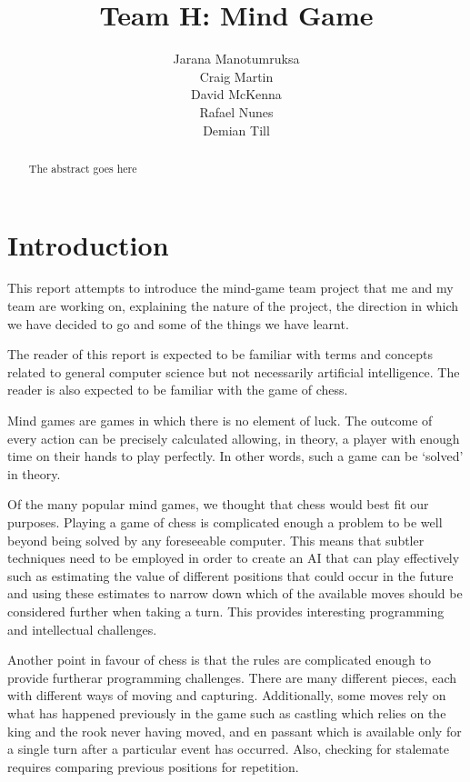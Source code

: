 \documentclass{l3proj}
\begin{document}
\title{Team H: Mind Game}
\author{Jarana Manotumruksa\\
	Craig Martin \\
	David McKenna \\
	Rafael Nunes \\
	Demian Till \\
	}
\maketitle
\begin{abstract}

The abstract goes here

\end{abstract}
\educationalconsent
\tableofcontents
\chapter{Introduction}
\label{intro}

This report attempts to introduce the mind-game team project that me and my team are
working on, explaining the nature of the project, the direction in which we have decided to
go and some of the things we have learnt.

The reader of this report is expected to be familiar with terms and concepts related to
general computer science but not necessarily artificial intelligence. The reader is also
expected to be familiar with the game of chess.

Mind games are games in which there is no element of luck. The outcome of every action
can be precisely calculated allowing, in theory, a player with enough time on their hands to
play perfectly. In other words, such a game can be ‘solved’ in theory.

Of the many popular mind games, we thought that chess would best fit our purposes.
Playing a game of chess is complicated enough a problem to be well beyond being solved
by any foreseeable computer. This means that subtler techniques need to be employed in
order to create an AI that can play effectively such as estimating the value of different
positions that could occur in the future and using these estimates to narrow down which of
the available moves should be considered further when taking a turn. This provides
interesting programming and intellectual challenges.

Another point in favour of chess is that the rules are complicated enough to provide furtherar
programming challenges. There are many different pieces, each with different ways of
moving and capturing. Additionally, some moves rely on what has happened previously in
the game such as castling which relies on the king and the rook never having moved, and
en passant which is available only for a single turn after a particular event has occurred.
Also, checking for stalemate requires comparing previous positions for repetition.
\end{document}
